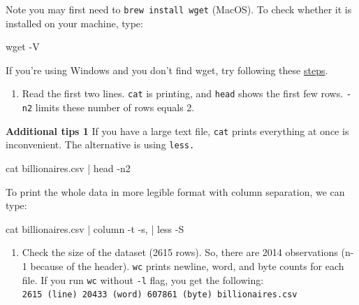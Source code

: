 \documentclass[
  letterpaper,
  DIV=11,
  numbers=noendperiod]{scrreprt}
\newenvironment{Shaded}{\begin{snugshade}}{\end{snugshade}}
\newcommand{\AttributeTok}[1]{\textcolor[rgb]{0.40,0.45,0.13}{#1}}
\newcommand{\ExtensionTok}[1]{\textcolor[rgb]{0.00,0.23,0.31}{#1}}
\newcommand{\FunctionTok}[1]{\textcolor[rgb]{0.28,0.35,0.67}{#1}}
\newcommand{\KeywordTok}[1]{\textcolor[rgb]{0.00,0.23,0.31}{#1}}
\newcommand{\NormalTok}[1]{\textcolor[rgb]{0.00,0.23,0.31}{#1}}
\providecommand{\tightlist}{%
  \setlength{\itemsep}{0pt}\setlength{\parskip}{0pt}}\usepackage{longtable,booktabs,array}
\begin{document}
Note you may first need to \texttt{brew\ install\ wget} (MacOS). To
check whether it is installed on your machine, type:

\begin{Shaded}
\begin{Highlighting}[]
\FunctionTok{wget} \AttributeTok{{-}V}
\end{Highlighting}
\end{Shaded}

If you're using Windows and you don't find wget, try following these
\href{https://builtvisible.com/download-your-website-with-wget/}{steps}.

\begin{enumerate}
\def\labelenumi{\arabic{enumi}.}
\setcounter{enumi}{1}
\tightlist
\item
  Read the first two lines. \texttt{cat} is printing, and \texttt{head}
  shows the first few rows. \texttt{-n2} limits these number of rows
  equals 2.
\end{enumerate}

\textbf{Additional tips 1} If you have a large text file, \texttt{cat}
prints everything at once is inconvenient. The alternative is using
\texttt{less.}

\begin{Shaded}
\begin{Highlighting}[]
\FunctionTok{cat}\NormalTok{ billionaires.csv }\KeywordTok{|} \FunctionTok{head} \AttributeTok{{-}n2}
\end{Highlighting}
\end{Shaded}

To print the whole data in more legible format with column separation,
we can type:

\begin{Shaded}
\begin{Highlighting}[]
\FunctionTok{cat}\NormalTok{ billionaires.csv }\KeywordTok{|} \ExtensionTok{column} \AttributeTok{{-}t} \AttributeTok{{-}s,} \KeywordTok{|} \FunctionTok{less} \AttributeTok{{-}S}
\end{Highlighting}
\end{Shaded}

\begin{enumerate}
\def\labelenumi{\arabic{enumi}.}
\setcounter{enumi}{2}
\tightlist
\item
  Check the size of the dataset (2615 rows). So, there are 2014
  observations (n-1 because of the header). \texttt{wc} prints newline,
  word, and byte counts for each file. If you run \texttt{wc} without
  \texttt{-l} flag, you get the following:
  \texttt{2615\ (line)\ 20433\ (word)\ 607861\ (byte)\ billionaires.csv}
\end{enumerate}
\end{document}
